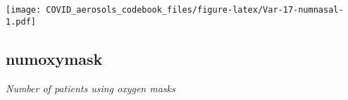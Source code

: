 \documentclass[]{article}
\begin{document}
\begin{minipage}{0.25 \textwidth}

\texttt{[image: COVID\_aerosols\_codebook\_files/figure-latex/Var-17-numnasal-1.pdf]}

\end{minipage}

\noindent\makebox[\linewidth]{\rule{\textwidth}{0.4pt}}

\hypertarget{numoxymask}{%
\subsection{numoxymask}\label{numoxymask}}

\emph{Number of patients using oxygen masks}

\begin{minipage}{0.75 \textwidth}


\end{minipage}
\end{document}

